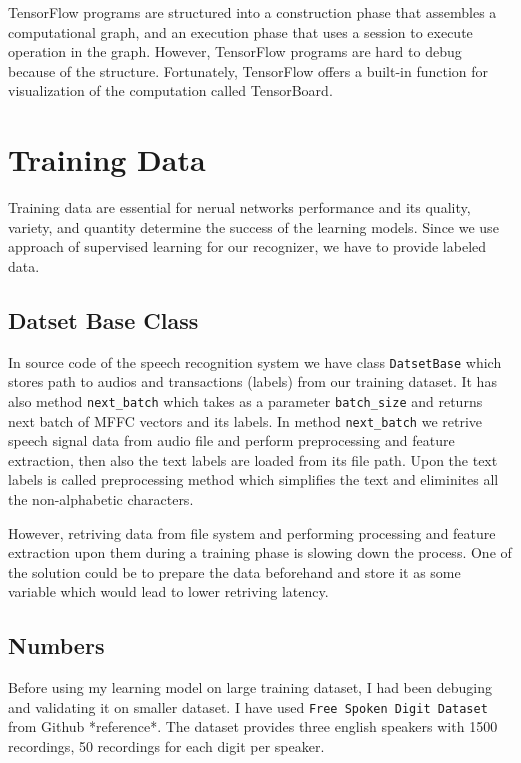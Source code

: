 TensorFlow programs are structured into a construction phase that assembles a computational graph, and an execution phase that uses a session to execute operation in the graph.
However, TensorFlow programs are hard to debug because of the structure. Fortunately, TensorFlow offers a built-in function for visualization of the computation called TensorBoard.

\section{Training Data}

Training data are essential for nerual networks performance and its quality, variety, and quantity determine the success of the learning models.
Since we use approach of supervised learning for our recognizer, we have to provide labeled data.

\subsection{Datset Base Class}

In source code of the speech recognition system we have class \texttt{DatsetBase} which stores path to audios and transactions (labels) from our training dataset.
It has also method \texttt{next\_batch} which takes as a parameter \texttt{batch\_size} and returns next batch of MFFC vectors and its labels.
In method \texttt{next\_batch} we retrive speech signal data from audio file and perform preprocessing and feature extraction, then also the text labels are loaded from its file path.
Upon the text labels is called preprocessing method which simplifies the text and eliminites all the non-alphabetic characters.

However, retriving data from file system and performing processing and feature extraction upon them during a training phase is slowing down the process.
One of the solution could be to prepare the data beforehand and store it as some variable which would lead to lower retriving latency.

\subsection{Numbers}

Before using my learning model on large training dataset, I had been debuging and validating it on smaller dataset.
I have used \texttt{Free Spoken Digit Dataset} from Github *reference*.
The dataset provides three english speakers with 1500 recordings, 50 recordings for each digit per speaker.

